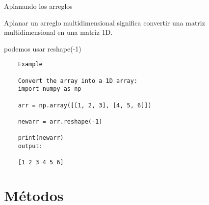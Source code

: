 Aplanando los arreglos

Aplanar un arreglo multidimensional significa convertir una matriz multidimensional en una matriz 1D.

podemos usar reshape(-1)

\begin{verbatim}
	Example
	
	Convert the array into a 1D array:
	import numpy as np
	
	arr = np.array([[1, 2, 3], [4, 5, 6]])
	
	newarr = arr.reshape(-1)
	
	print(newarr) 
	output:
	
	[1 2 3 4 5 6] 
\end{verbatim}
\section{M\'etodos}


